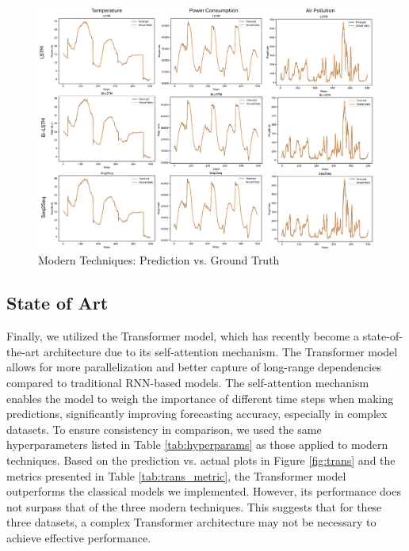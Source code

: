\documentclass{scrartcl}
\begin{document}
\begin{figure}[H]
	\begin{center}
		\includegraphics[scale=0.8]{Latex_report/fig/modern.pdf}
	\end{center}
	\caption{Modern Techniques: Prediction vs. Ground Truth}
	\label{fig:modern}
\end{figure}



\subsection{State of Art}
Finally, we utilized the Transformer model, which has recently become a state-of-the-art architecture due to its self-attention mechanism. The Transformer model allows for more parallelization and better capture of long-range dependencies compared to traditional RNN-based models. The self-attention mechanism enables the model to weigh the importance of different time steps when making predictions, significantly improving forecasting accuracy, especially in complex datasets. 
To ensure consistency in comparison, we used the same hyperparameters listed in Table \ref{tab:hyperparams} as those applied to modern techniques. Based on the prediction vs. actual plots in Figure \ref{fig:trans} and the metrics presented in Table \ref{tab:trans_metric}, the Transformer model outperforms the classical models we implemented. However, its performance does not surpass that of the three modern techniques. This suggests that for these three datasets, a complex Transformer architecture may not be necessary to achieve effective performance.
\end{document}
